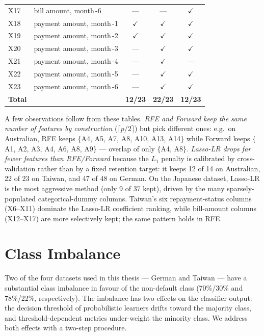 \begin{table}[H]
\begin{tabular}{l l c c c}
X17  & bill amount, month\,-6               & ---          & ---          & $\checkmark$\\
X18  & payment amount, month\,-1            & $\checkmark$ & $\checkmark$ & $\checkmark$\\
X19  & payment amount, month\,-2            & $\checkmark$ & $\checkmark$ & $\checkmark$\\
X20  & payment amount, month\,-3            & ---          & $\checkmark$ & $\checkmark$\\
X21  & payment amount, month\,-4            & ---          & $\checkmark$ & ---\\
X22  & payment amount, month\,-5            & ---          & $\checkmark$ & $\checkmark$\\
X23  & payment amount, month\,-6            & ---          & $\checkmark$ & $\checkmark$\\
\midrule
\textbf{Total} & & \textbf{12/23} & \textbf{22/23} & \textbf{12/23}\\
\bottomrule
\end{tabular}
\end{table}

A few observations follow from these tables.  \emph{RFE and Forward
keep the same number of features by construction} ($\lceil p/2\rceil$)
but pick different ones: e.g.\ on Australian, RFE keeps
$\{$A4, A5, A7, A8, A10, A13, A14$\}$ while Forward keeps
$\{$A1, A2, A3, A4, A6, A8, A9$\}$ --- overlap of only $\{$A4, A8$\}$.
\emph{Lasso-LR drops far fewer features than RFE/Forward} because
the $L_1$ penalty is calibrated by cross-validation rather than by a
fixed retention target: it keeps 12 of 14 on Australian, 22 of 23 on
Taiwan, and 47 of 48 on German.  On the Japanese dataset, Lasso-LR
is the most aggressive method (only 9 of 37 kept), driven by the many
sparsely-populated categorical-dummy columns.  Taiwan's six
repayment-status columns (X6--X11) dominate the Lasso-LR coefficient
ranking, while bill-amount columns (X12--X17) are more selectively
kept; the same pattern holds in RFE.

\section{Class Imbalance}
\label{sec:imbalance}

Two of the four datasets used in this thesis --- German and Taiwan
--- have a substantial class imbalance in favour of the
non-default class (70\%/30\% and 78\%/22\%, respectively). The
imbalance has two effects on the classifier output: the decision
threshold of probabilistic learners drifts toward the majority class,
and threshold-dependent metrics under-weight the minority class.
We address both effects with a two-step procedure.

